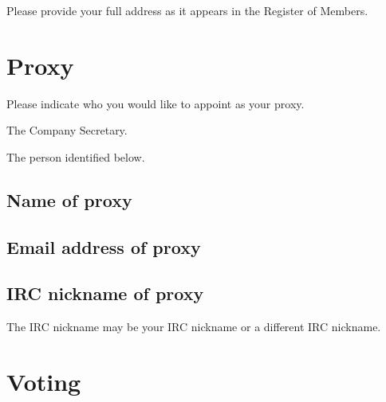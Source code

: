 \documentclass[a4paper,10pt]{article}
\begin{document}
\begin{Form}
Please provide your full address as it appears in the Register of Members.

\begin{framed}%
  \TextField[width=\textwidth,donotscroll=true,multiline=true,name=address]{ }%
\end{framed}%

\section{Proxy}

Please indicate who you would like to appoint as your proxy.

\ChoiceMenu[radio,radiosymbol=\ding{108},name=proxyradio]{ }{ } The Company Secretary.

\ChoiceMenu[radio,radiosymbol=\ding{108},name=proxyradio]{ }{ } The person identified below.

\subsection{Name of proxy}

\begin{framed}%
  \TextField[width=\textwidth,donotscroll=true,name=proxyname]{ }%
\end{framed}%

\subsection{Email address of proxy}

\begin{framed}%
  \TextField[width=\textwidth,donotscroll=true,name=proxyemail]{ }%
\end{framed}%

\subsection{IRC nickname of proxy}

The IRC nickname may be your IRC nickname or a different IRC nickname.

\begin{framed}%
  \TextField[width=\textwidth,donotscroll=true,name=proxynickname]{ }%
\end{framed}%

\section{Voting}


\end{Form}
\end{document}
